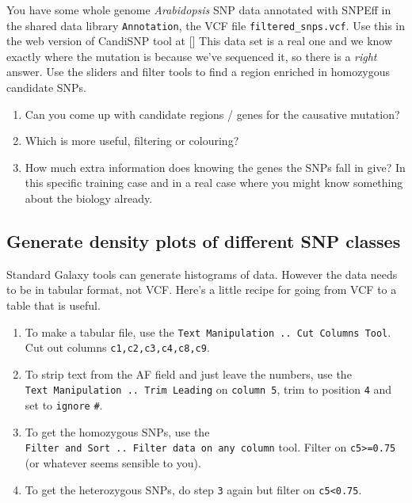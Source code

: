 \documentclass[12pt,]{book}
\providecommand{\tightlist}{%
  \setlength{\itemsep}{0pt}\setlength{\parskip}{0pt}}
\begin{document}
You have some whole genome \emph{Arabidopsis} SNP data annotated with
SNPEff in the shared data library \texttt{Annotation}, the VCF file
\texttt{filtered\_snps.vcf}. Use this in the web version of CandiSNP
tool at {[}{]} This data set is a real one and we know exactly where the
mutation is because we've sequenced it, so there is a \emph{right}
answer. Use the sliders and filter tools to find a region enriched in
homozygous candidate SNPs.

\begin{enumerate}
\def\labelenumi{\arabic{enumi}.}
\tightlist
\item
  Can you come up with candidate regions / genes for the causative
  mutation?
\item
  Which is more useful, filtering or colouring?
\item
  How much extra information does knowing the genes the SNPs fall in
  give? In this specific training case and in a real case where you
  might know something about the biology already.
\end{enumerate}

\subsection{Generate density plots of different SNP
classes}\label{generate-density-plots-of-different-snp-classes}

Standard Galaxy tools can generate histograms of data. However the data
needs to be in tabular format, not VCF. Here's a little recipe for going
from VCF to a table that is useful.

\begin{enumerate}
\def\labelenumi{\arabic{enumi}.}
\tightlist
\item
  To make a tabular file, use the
  \texttt{Text\ Manipulation\ ..\ Cut\ Columns\ Tool}. Cut out columns
  \texttt{c1,c2,c3,c4,c8,c9}.
\item
  To strip text from the AF field and just leave the numbers, use the
  \texttt{Text\ Manipulation\ ..\ Trim\ Leading} on \texttt{column\ 5},
  trim to position \texttt{4} and set to \texttt{ignore} \texttt{\#}.
\item
  To get the homozygous SNPs, use the
  \texttt{Filter\ and\ Sort\ ..\ Filter\ data\ on\ any\ column} tool.
  Filter on \texttt{c5\textgreater{}=0.75} (or whatever seems sensible
  to you).
\item
  To get the heterozygous SNPs, do step \texttt{3} again but filter on
  \texttt{c5\textless{}0.75}.
\end{enumerate}
\end{document}
